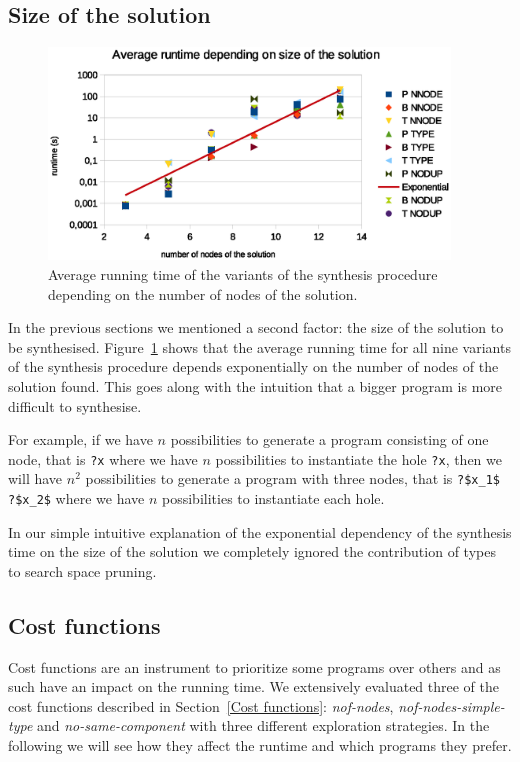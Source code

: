 \subsection{Size of the solution}
\begin{figure}[p]
    \centering
    \includegraphics[width=0.95\textwidth]{time_vs_nof_nodes.eps}
    \caption{Average running time of the variants of the synthesis procedure depending on the number of nodes of the solution.}
    \label{fig:runtime_vs_nof_nodes}
\end{figure}
In the previous sections we mentioned a second factor: the size of the solution to be synthesised. Figure~\ref{fig:runtime_vs_nof_nodes} shows that the average running time for all nine variants of the synthesis procedure depends exponentially on the number of nodes of the solution found. This goes along with the intuition that a bigger program is more difficult to synthesise.

For example, if we have $n$ possibilities to generate a program consisting of one node, that is \lstinline!?x! where we have $n$ possibilities to instantiate the hole \lstinline!?x!, then we will have $n^2$ possibilities to generate a program with three nodes, that is \lstinline!?$x_1$ ?$x_2$! where we have $n$ possibilities to instantiate each hole.




In our simple intuitive explanation of the exponential dependency of the synthesis time on the size of the solution we completely ignored the contribution of types to search space pruning.

\subsection{Cost functions}\label{Eval. Cost functions}
Cost functions are an instrument to prioritize some programs over others and as such have an impact on the running time. We extensively evaluated three of the cost functions described in Section~\ref{Cost functions}: \textit{nof-nodes}, \textit{nof-nodes-simple-type} and \textit{no-same-component} with three different exploration strategies. In the following we will see how they affect the runtime and which programs they prefer.

